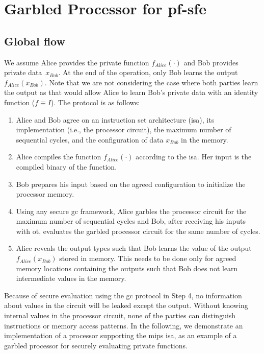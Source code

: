 \section{Garbled Processor for \acrshort{pf-sfe}} \label{sec:processor-pro-pfsfe}
\subsection{Global flow}\label{ssec:processor-mips-flow}
We assume Alice provides the private function $f_{Alice}(\cdot)$ and Bob provides private data~$x_{Bob}$.
At the end of the operation, only Bob learns the output $f_{Alice}(x_{Bob})$.
Note that we are not considering the case where both parties learn the output as that would allow Alice to learn Bob's private data with an identity function ($f\equiv I$).
The protocol is as follows:

\begin{enumerate}
\item
  Alice and Bob agree on an instruction set architecture (\acrshort{isa}), its implementation (i.e., the processor circuit), the maximum number of sequential cycles, and the configuration of data $x_{Bob}$ in the memory.
\item
  Alice compiles the function $f_{Alice}(\cdot)$ according to the \acrshort{isa}.
  Her input is the compiled binary of the function.
\item
  Bob prepares his input based on the agreed configuration to initialize the processor memory.
\item
  Using any secure \acrshort{gc} framework, Alice garbles the processor circuit for the maximum number of sequential cycles and Bob, after receiving his inputs with \acrshort{ot}, evaluates the garbled processor circuit for the same number of cycles.

\item
  Alice reveals the output types such that Bob learns the value of the output $f_{Alice}(x_{Bob})$ stored in memory.
  This needs to be done only for agreed memory locations containing the outputs such that Bob does not learn intermediate values in the memory.
\end{enumerate}

Because of secure evaluation using the \acrshort{gc} protocol in Step 4, no information about values in the circuit will be leaked except the output.
Without knowing internal values in the processor circuit, none of the parties can distinguish instructions or memory access patterns.
In the following, we demonstrate an implementation of a processor supporting the \gls{mips} \acrshort{isa}, as an example of a garbled processor for securely evaluating private functions.


